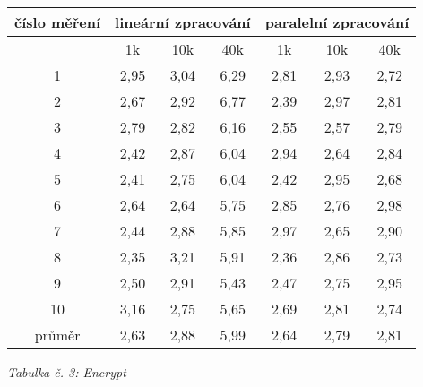 \documentclass{article}
\begin{document}
\begin{center}
	\begin{tabular}{ c | c | c | c | c | c | c }
		\textbf{číslo měření} & \multicolumn{3}{c|}{\textbf{lineární zpracování}} & \multicolumn{3}{|c}{\textbf{paralelní zpracování}} \\
		\hline
		& 1k & 10k & 40k & 1k & 10k & 40k \\
		\hline
		\hline
		1 & 2,95 & 3,04 & 6,29 & 2,81 & 2,93 & 2,72 \\
		\hline
		2 & 2,67 & 2,92 & 6,77 & 2,39 & 2,97 & 2,81 \\
		\hline
		3 & 2,79 & 2,82 & 6,16 & 2,55 & 2,57 & 2,79 \\
		\hline
		4 & 2,42 & 2,87 & 6,04 & 2,94 & 2,64 & 2,84 \\
		\hline
		5 & 2,41 & 2,75 & 6,04 & 2,42 & 2,95 & 2,68 \\
		\hline
		6 & 2,64 & 2,64 & 5,75 & 2,85 & 2,76 & 2,98 \\
		\hline
		7 & 2,44 & 2,88 & 5,85 & 2,97 & 2,65 & 2,90 \\
		\hline
		8 & 2,35 & 3,21 & 5,91 & 2,36 & 2,86 & 2,73 \\
		\hline
		9 & 2,50 & 2,91 & 5,43 & 2,47 & 2,75 & 2,95 \\
		\hline
		10 & 3,16 & 2,75 & 5,65 & 2,69 & 2,81 & 2,74 \\
		\hline
		průměr & 2,63 & 2,88 & 5,99 & 2,64 & 2,79 & 2,81 \\
	\end{tabular}
	\newline
	\textit{Tabulka č. 3: Encrypt}
\end{center}
\end{document}
